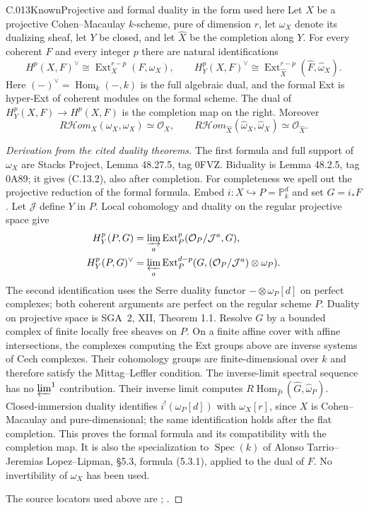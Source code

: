 \begin{saresult}{C.013}{Known}{Projective and formal duality in the form used here}
Let $X$ be a projective Cohen--Macaulay $k$-scheme, pure of dimension $r$,
let $\omega_X$ denote its dualizing sheaf, let $Y$ be closed, and let
$\widehat X$ be the completion along $Y$.
For every coherent $F$ and every integer $p$ there are natural identifications
\[
 H^p(X,F)^\vee\cong\operatorname{Ext}^{r-p}_X(F,\omega_X),
 \qquad
 H_Y^p(X,F)^\vee\cong
 \operatorname{Ext}^{r-p}_{\widehat X}(\widehat F,\widehat\omega_X).
 \tag{C.13.1}
\]
Here $(-)^\vee=\operatorname{Hom}_k(-,k)$ is the full algebraic dual,
and the formal Ext is hyper-Ext of coherent modules on the formal scheme.
The dual of $H_Y^p(X,F)\to H^p(X,F)$ is the completion map on the right.
Moreover
\[
 R\mathcal Hom_X(\omega_X,\omega_X)\simeq\mathcal O_X,
 \qquad
 R\mathcal Hom_{\widehat X}(\widehat\omega_X,\widehat\omega_X)
 \simeq\mathcal O_{\widehat X}.
 \tag{C.13.2}
\]
\end{saresult}
\begin{proof}[Derivation from the cited duality theorems]
The first formula and full support of $\omega_X$ are Stacks Project,
Lemma 48.27.5, tag 0FVZ. Biduality is Lemma 48.2.5, tag 0A89;
it gives (C.13.2), also after completion.
For completeness we spell out the projective reduction of the formal formula.
Embed $i:X\hookrightarrow P=\mathbb P_k^d$ and set $G=i_*F$.
Let $\mathcal J$ define $Y$ in $P$.
Local cohomology and duality on the regular projective space give
\[
 \begin{split}
 H_Y^p(P,G)&=\varinjlim_a
       \operatorname{Ext}^p_P(\mathcal O_P/\mathcal J^a,G),\\
 H_Y^p(P,G)^\vee&=\varprojlim_a
       \operatorname{Ext}^{d-p}_P
       (G,(\mathcal O_P/\mathcal J^a)\otimes\omega_P).
 \end{split}
\]
The second identification uses the Serre duality functor
$-\otimes\omega_P[d]$ on perfect complexes; both coherent arguments are
perfect on the regular scheme $P$. Duality on projective space is
SGA~2, XII, Theorem 1.1.
Resolve $G$ by a bounded complex of finite locally free sheaves on $P$.
On a finite affine cover with affine intersections, the complexes computing
the Ext groups above are inverse systems of Cech complexes. Their cohomology
groups are finite-dimensional over $k$ and therefore satisfy the
Mittag--Leffler condition. The inverse-limit spectral sequence has no
$\varprojlim^1$ contribution. Their inverse limit computes
$R\operatorname{Hom}_{\widehat P}(\widehat G,\widehat\omega_P)$.
Closed-immersion duality identifies
$i^!(\omega_P[d])$ with $\omega_X[r]$, since $X$ is Cohen--Macaulay and pure-dimensional;
the same identification holds after the flat completion.
This proves the formal formula and its compatibility with the completion
map. It is also the specialization to $\operatorname{Spec}(k)$ of
Alonso Tarrio--Jeremias Lopez--Lipman, \S5.3, formula (5.3.1), applied
to the dual of $F$. No invertibility of $\omega_X$ has been used.

The source locators used above are \cite[48.27.5 and 48.2.5]{C-stacks}; \cite[5.3, especially (5.3.1)]{C-ajl1997}.
\end{proof}

